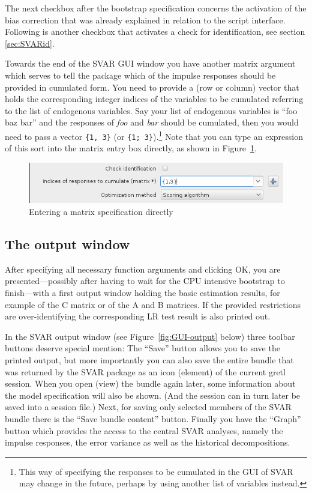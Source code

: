 \documentclass[a4paper,10pt]{article}
\newcommand{\app}[1]{\textsf{#1}}
\newcounter{script}[section]
\begin{document}
The next checkbox after the bootstrap specification concerns the
activation of the bias correction that was already explained in
relation to the script interface. Following is another checkbox that
activates a check for identification, see section \ref{sec:SVARid}.

Towards the end of the SVAR GUI window you have another matrix
argument which serves to tell the package which of the impulse
responses should be provided in cumulated form. You need to provide a
(row or column) vector that holds the corresponding integer indices of
the variables to be cumulated referring to the list of endogenous
variables. Say your list of endogenous variables is ``foo baz bar''
and the responses of \emph{foo} and \emph{bar} should be cumulated,
then you would need to pass a vector \texttt{\{1, 3\}} (or
\texttt{\{1; 3\}}).\footnote{This way of specifying the responses to
  be cumulated in the GUI of SVAR may change in the future, perhaps by
  using another list of variables instead.} Note that you can type an
expression of this sort into the matrix entry box directly, as shown in
Figure~\ref{fig:matrix-entry}.

\begin{figure}[htbp]
  \centering
  \includegraphics[scale=0.5]{dialog_mat.png}
  \caption{Entering a matrix specification directly}
  \label{fig:matrix-entry}
\end{figure}

\subsection{The output window}

After specifying all necessary function arguments and clicking OK, you
are presented---possibly after having to wait for the CPU intensive
bootstrap to finish---with a first output window holding the basic
estimation results, for example of the C matrix or of the A and B
matrices. If the provided restrictions are over-identifying the
corresponding LR test result is also printed out.

In the SVAR output window (see Figure~\ref{fig:GUI-output} below)
three toolbar buttons deserve special mention: The ``Save'' button
allows you to save the printed output, but more importantly you can
also save the entire bundle that was returned by the SVAR package as
an icon (element) of the current \app{gretl} session. When you open
(view) the bundle again later, some information about the model
specification will also be shown. (And the session can in turn later
be saved into a session file.) Next, for saving only selected members
of the SVAR bundle there is the ``Save bundle content''
button. Finally you have the ``Graph'' button which provides the
access to the central SVAR analyses, namely the impulse responses, the
error variance as well as the historical decompositions.
\end{document}
